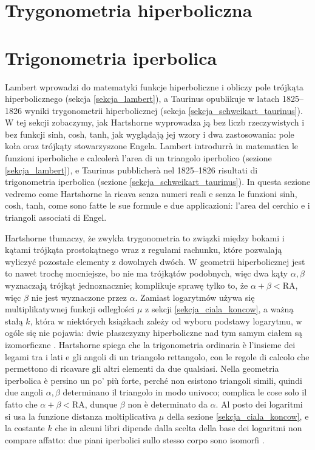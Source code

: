 
\section{Trygonometria hiperboliczna} %
\section{Trigonometria iperbolica} %
\label{sekcja_trygonometria}

Lambert wprowadzi do matematyki funkcje hiperboliczne i obliczy pole trójkąta hiperbolicznego (sekcja \ref{sekcja_lambert}), a Taurinus opublikuje w latach 1825--1826 wyniki trygonometrii hiperbolicznej (sekcja \ref{sekcja_schweikart_taurinus}). %
W tej sekcji zobaczymy, jak Hartshorne wyprowadza ją bez liczb rzeczywistych i bez funkcji sinh, cosh, tanh, jak wyglądają jej wzory i dwa zastosowania: pole koła oraz trójkąty stowarzyszone Engela. %
Lambert introdurrà in matematica le funzioni iperboliche e calcolerà l'area di un triangolo iperbolico (sezione \ref{sekcja_lambert}), e Taurinus pubblicherà nel 1825--1826 risultati di trigonometria iperbolica (sezione \ref{sekcja_schweikart_taurinus}). %
In questa sezione vedremo come Hartshorne la ricava senza numeri reali e senza le funzioni sinh, cosh, tanh, come sono fatte le sue formule e due applicazioni: l'area del cerchio e i triangoli associati di Engel. %

Hartshorne \cite[s. 403--404]{hartshorne_2000} tłumaczy, że zwykła trygonometria to związki między bokami i kątami trójkąta prostokątnego wraz z regułami rachunku, które pozwalają wyliczyć pozostałe elementy z dowolnych dwóch. %
W geometrii hiperbolicznej jest to nawet trochę mocniejsze, bo nie ma trójkątów podobnych, więc dwa kąty $\alpha, \beta$ wyznaczają trójkąt jednoznacznie; komplikuje sprawę tylko to, że $\alpha + \beta < \mathrm{RA}$, więc $\beta$ nie jest wyznaczone przez $\alpha$. %
Zamiast logarytmów używa się multiplikatywnej funkcji odległości $\mu$ z sekcji \ref{sekcja_ciala_koncow}, a ważną stałą $k$, która w niektórych książkach zależy od wyboru podstawy logarytmu, w ogóle się nie pojawia: dwie płaszczyzny hiperboliczne nad tym samym ciałem są izomorficzne \cite[s. 296, 404]{hartshorne_2000}. %
Hartshorne \cite[p. 403--404]{hartshorne_2000} spiega che la trigonometria ordinaria è l'insieme dei legami tra i lati e gli angoli di un triangolo rettangolo, con le regole di calcolo che permettono di ricavare gli altri elementi da due qualsiasi. %
Nella geometria iperbolica è persino un po' più forte, perché non esistono triangoli simili, quindi due angoli $\alpha, \beta$ determinano il triangolo in modo univoco; complica le cose solo il fatto che $\alpha + \beta < \mathrm{RA}$, dunque $\beta$ non è determinato da $\alpha$. %
Al posto dei logaritmi si usa la funzione distanza moltiplicativa $\mu$ della sezione \ref{sekcja_ciala_koncow}, e la costante $k$ che in alcuni libri dipende dalla scelta della base dei logaritmi non compare affatto: due piani iperbolici sullo stesso corpo sono isomorfi \cite[p. 296, 404]{hartshorne_2000}. %


